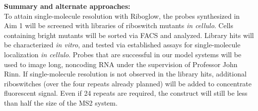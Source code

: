 
\textbf{Summary and alternate approaches:}\\
To attain single-molecule resolution with Riboglow, the probes synthesized in Aim 1 will be screened with libraries of riboswitch mutants \textit{in cellulo}. Cells containing bright mutants will be sorted via FACS and analyzed. Library hits will be characterized \textit{in vitro}, and tested via established assays for single-molecule localization \textit{in cellulo}. Probes that are successful in our model systems will be used to image long, noncoding RNA under the supervision of Professor John Rinn. If single-molecule resolution is not observed in the library hits, additional riboswitches (over the four repeats already planned) will be added to concentrate fluorescent signal. Even if 24 repeats are required, the construct will still be less than half the size of the MS2 system.

